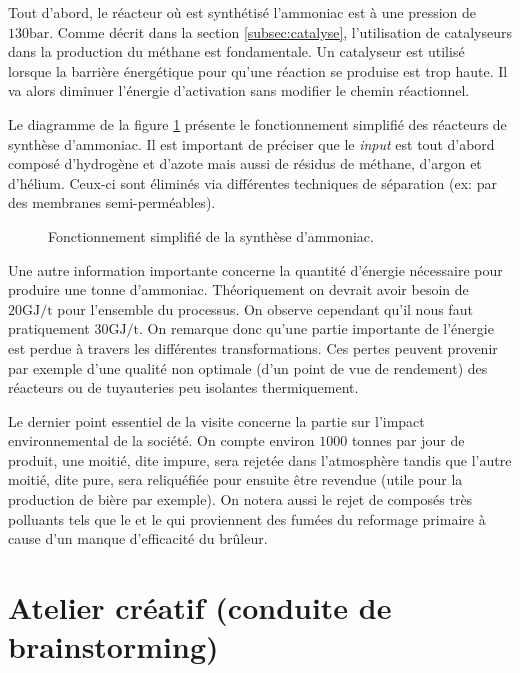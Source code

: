 \documentclass[a4paper, oneside, 12pt]{article}
\begin{document}
Tout d'abord, le réacteur où est synthétisé l'ammoniac est à une pression de $130 \si{\bar}$.
Comme décrit dans la section \ref{subsec:catalyse}, l'utilisation de catalyseurs dans la
production du méthane est fondamentale. Un catalyseur est utilisé lorsque la 
barrière énergétique pour qu'une réaction se produise est trop haute. Il va alors 
diminuer l'énergie d'activation sans modifier le chemin réactionnel.

Le diagramme de la figure \ref{fig:synthese} présente le fonctionnement simplifié 
des réacteurs de synthèse d'ammoniac. Il est important de préciser que le \emph{input}
est tout d'abord composé d'hydrogène et d'azote mais aussi de résidus de méthane, 
d'argon et d'hélium. Ceux-ci sont éliminés via différentes techniques 
de séparation (ex: par des membranes semi-perméables). 

\begin{figure}[h!]
	\begin{center}
		
	\end{center}
	\caption{Fonctionnement simplifié de la synthèse d'ammoniac.}
	\label{fig:synthese}
\end{figure}

Une autre information importante concerne la quantité d'énergie nécessaire pour produire
une tonne d'ammoniac. Théoriquement on devrait avoir besoin de $20 \si{\giga\joule/\tonne}$
pour l'ensemble du processus. On observe cependant qu'il nous faut 
pratiquement $30 \si{\giga\joule/\tonne}$. On remarque donc qu'une partie 
importante de l'énergie est perdue à travers les différentes transformations. 
Ces pertes peuvent provenir par exemple d'une qualité non optimale (d'un point de vue 
de rendement) des réacteurs ou de tuyauteries peu isolantes thermiquement.

Le dernier point essentiel de la visite concerne la partie sur l'impact environnemental 
de la société. On compte environ $1000$ tonnes par jour de  produit, une moitié,
dite impure, sera rejetée dans l'atmosphère tandis que l'autre moitié, dite pure, 
sera reliquéfiée pour ensuite être revendue (utile pour la production de bière par exemple).
On notera aussi le rejet de composés très polluants tels que le  et le  
qui proviennent des fumées du reformage primaire à cause d'un manque d'efficacité
du brûleur.

\section{Atelier créatif (conduite de brainstorming)}
\end{document}
